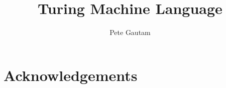 \documentclass{l4proj}
\begin{document}
\title{Turing Machine Language} %
\author{Pete Gautam}

\maketitle

\begin{abstract}
\end{abstract}

\chapter*{Acknowledgements}
%
%


%
%
\def\consentname {Pete Gautam} %
\def\consentdate {27 September 2022} %
%
\educationalconsent


\tableofcontents
\end{document}
